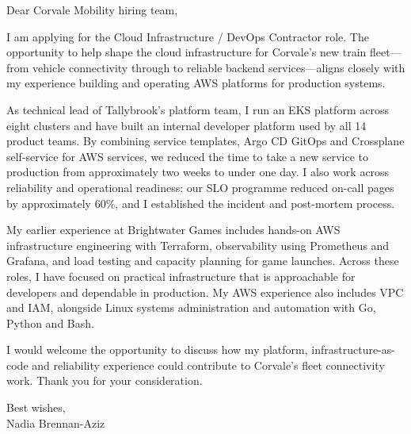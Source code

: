 \documentclass[11pt,a4paper]{article}
\begin{document}
Dear Corvale Mobility hiring team,

I am applying for the Cloud Infrastructure / DevOps Contractor role. The opportunity to help shape the cloud infrastructure for Corvale’s new train fleet—from vehicle connectivity through to reliable backend services—aligns closely with my experience building and operating AWS platforms for production systems.

As technical lead of Tallybrook’s platform team, I run an EKS platform across eight clusters and have built an internal developer platform used by all 14 product teams. By combining service templates, Argo CD GitOps and Crossplane self-service for AWS services, we reduced the time to take a new service to production from approximately two weeks to under one day. I also work across reliability and operational readiness: our SLO programme reduced on-call pages by approximately 60\%, and I established the incident and post-mortem process.

My earlier experience at Brightwater Games includes hands-on AWS infrastructure engineering with Terraform, observability using Prometheus and Grafana, and load testing and capacity planning for game launches. Across these roles, I have focused on practical infrastructure that is approachable for developers and dependable in production. My AWS experience also includes VPC and IAM, alongside Linux systems administration and automation with Go, Python and Bash.

I would welcome the opportunity to discuss how my platform, infrastructure-as-code and reliability experience could contribute to Corvale’s fleet connectivity work. Thank you for your consideration.

Best wishes,\\
Nadia Brennan-Aziz
\end{document}
